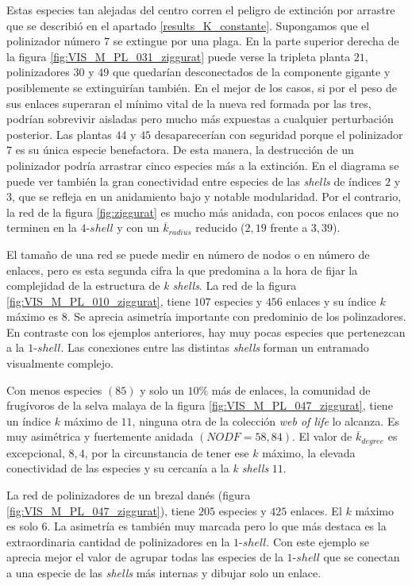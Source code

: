 Estas especies tan alejadas del centro corren el peligro de extinción por arrastre que se describió en el apartado \ref{results_K_constante}. Supongamos que el polinizador número $7$ se extingue por una plaga. En la parte superior derecha de la figura \ref{fig:VIS_M_PL_031_ziggurat} puede verse la tripleta planta $21$, polinizadores $30$ y $49$ que quedarían desconectados de la componente gigante y posiblemente se extinguirían también. En el mejor de los casos, si por el peso de sus enlaces superaran el mínimo vital de la nueva red formada por las tres, podrían sobrevivir aisladas pero mucho más expuestas a cualquier perturbación posterior. Las plantas $44$ y $45$ desaparecerían con seguridad porque el polinizador $7$ es su única especie benefactora. De esta manera, la destrucción de un polinizador podría arrastrar cinco especies más a la extinción. En el diagrama se puede ver también la gran conectividad entre especies de las \textit{shells} de índices $2$ y $3$, que se refleja en un anidamiento bajo y notable modularidad. Por el contrario, la red de la figura \ref{fig:ziggurat} es mucho más anidada, con pocos enlaces que no terminen en la $4$-$shell$ y con un $\overline k_{radius}$ reducido ($2,19$ frente a $3,39$).


El tamaño de una red se puede medir en número de nodos o en número de enlaces, pero es esta segunda cifra la que predomina a la hora de fijar la complejidad de la estructura de \textit{k shells}. La red de la figura \ref{fig:VIS_M_PL_010_ziggurat}, tiene $107$ especies y $456$ enlaces y su índice $k$ máximo es $8$. Se aprecia asimetría importante con predominio de los polinzadores. En contraste con los ejemplos anteriores, hay muy pocas especies que pertenezcan a la $1$-$shell$. Las conexiones entre las distintas \textit{shells} forman un entramado visualmente complejo.

Con menos especies $(85)$ y solo un $10\%$ más de enlaces, la comunidad de frugívoros de la selva malaya de la figura \ref{fig:VIS_M_PL_047_ziggurat}, tiene un índice $k$ máximo de $11$, ninguna otra de la colección \textit{web of life} lo alcanza. Es muy asimétrica y fuertemente anidada $(NODF = 58,84)$. El valor de $\overline k_{degree}$ es excepcional, $8,4$, por la circunstancia de tener ese $k$ máximo, la elevada conectividad de las especies y su cercanía a la \textit{k shells} $11$.

La red de polinizadores de un brezal danés (figura \ref{fig:VIS_M_PL_047_ziggurat}), tiene $205$ especies y $425$ enlaces. El $k$ máximo es solo $6$. La asimetría es también muy marcada pero lo que más destaca es la extraordinaria cantidad de polinizadores en la $1$-$shell$. Con este ejemplo se aprecia mejor el valor de agrupar todas las especies de la $1$-$shell$ que se conectan a una especie de las \textit{shells} más internas y dibujar solo un enlace. 

